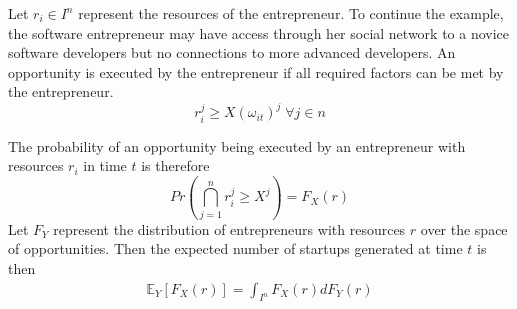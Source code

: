 \documentclass[12pt]{article}
\begin{document}
Let $r_i \in I^n$ represent the resources of the entrepreneur. To continue the example, the software entrepreneur may have access through her social network to a novice software developers but no connections to more advanced developers. An opportunity is executed by the entrepreneur if all required factors can be met by the entrepreneur. 
$$r_i^j \ge X(\omega_{it})^j \; \forall j \in n$$

\begin{comment}
We call an idea \textit{unbounded} for an individual if the idea can be executed and \textit{single bounded} on dimension $k$ if
$$\alpha_i^k = X(\omega{it})^k \wedge  \alpha_i^j > X(\omega{it})^j \; \forall j \ne k \in n$$
\end{comment}

The probability of an opportunity being executed by an entrepreneur with resources $r_i$ in time $t$ is therefore 
$$Pr\left(\bigcap _{j=1}^n  r_i^j \ge X^j\right) = F_X(r)$$
Let $F_Y$ represent the distribution of entrepreneurs with resources $r$ over the space of opportunities. Then the expected number of startups generated at time $t$ is then 
\begin{align}
\mathbb{E}_{Y}[F_X(r)]=\int_{I^n} F_X(r) dF_Y(r)
\end{align}
\end{document}
